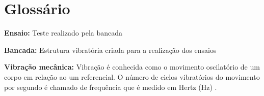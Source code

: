 \section*{Glossário}
    
    \textbf{Ensaio:} Teste realizado pela bancada 
 
    \textbf{Bancada:} Estrutura vibratória criada para a realização dos ensaios 
    
    \textbf{Vibração mecânica:} Vibração é conhecida como o movimento oscilatório de um corpo em relação ao um referencial. O número de ciclos vibratórios do movimento por segundo é chamado de frequência que é medido em Hertz (Hz) \cite{inman}.
    
